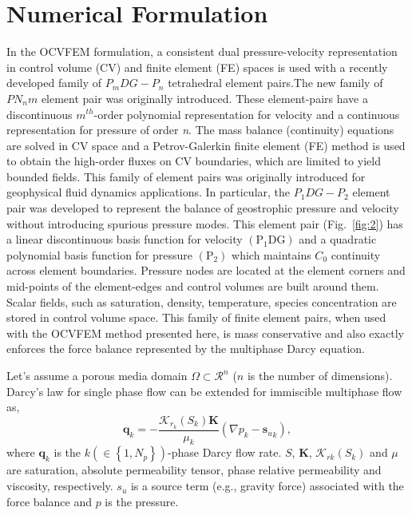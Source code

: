 \documentclass[preprint,authoryear,12pt]{elsarticle}
\begin{document}
\section{Numerical Formulation}\label{section:NumericalFormulation}
In the OCVFEM formulation, a consistent dual pressure-velocity representation in control volume (CV) and finite element (FE) spaces is used with a recently developed family of $P_{m}DG-P_{n}$ tetrahedral element pairs.The new family of $PN_{n}{m}$ element pair was originally introduced. These element-pairs have a discontinuous $m^{th}$-order polynomial representation for velocity and a continuous representation for pressure of order {\it n}.  The mass balance (continuity) equations are solved in CV space and a Petrov-Galerkin finite element (FE) method is used to obtain the high-order fluxes on CV boundaries, which are limited to yield bounded fields. 
This family of element pairs was originally introduced for geophysical fluid dynamics applications. In particular, the $P_{1}DG-P_{2}$ element pair was developed to represent the balance of geostrophic pressure and velocity without introducing spurious pressure modes. This element pair (Fig.~\ref{fig:2}) has a linear discontinuous basis function for velocity $\left(\text{P}_{1}\text{DG}\right)$ and a quadratic polynomial basis function for pressure $\left(\text{P}_{2}\right)$ which maintains $C_{\text{0}}$ continuity across element boundaries. Pressure nodes are located at the element corners and mid-points of the element-edges and control volumes are built around them. Scalar fields, such as saturation, density, temperature, species concentration are stored in control volume space. This family of finite element pairs, when used with the OCVFEM method presented here, is mass conservative and also exactly enforces the force balance represented by the multiphase Darcy equation.

Let's assume a porous media domain $\Omega\subset\mathcal{R}^{n}$ ($n$ is the number of dimensions). Darcy's law for single phase flow can be extended for immiscible multiphase flow as,
\begin{equation}
  \mathbf{q}_{k} = -\frac{\mathcal{K}_{{r}_k}\left(S_{k}\right)\mathbf{K}}{\mu_{k}}\left( \nabla p_{k} - {\mathbf{s}_{u}}_{k} \right),
\label{Eqn:DarcyEq}
\end{equation}
where $\mathbf{q}_{k}$ is the $k\left(\in\left\{1,N_{p}\right\}\right)$-phase Darcy flow rate. $S$, $\mathbf{K}$, $\mathcal{K}_{rk}\left(S_{k}\right)$ and $\mu$ are saturation, absolute permeability tensor, phase relative permeability and viscosity, respectively. $s_{u}$ is a source term (e.g., gravity force) associated with the force balance and $p$ is the pressure.
\end{document}
